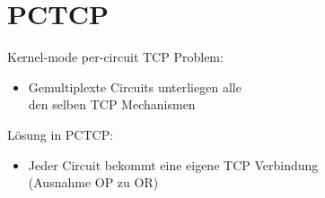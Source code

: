 \documentclass{beamer}
\begin{document}
\section{PCTCP}


\begin{frame}{Kernel-mode per-circuit TCP}{\secname}
  Problem:
  \begin{itemize}
    \item Gemultiplexte Circuits unterliegen alle\\ den selben TCP Mechanismen
  \end{itemize}
  Lösung in PCTCP:
  \begin{itemize}
    \item Jeder Circuit bekommt eine eigene TCP Verbindung \\ (Ausnahme  OP zu OR)
  \end{itemize}
\end{frame}
\end{document}
